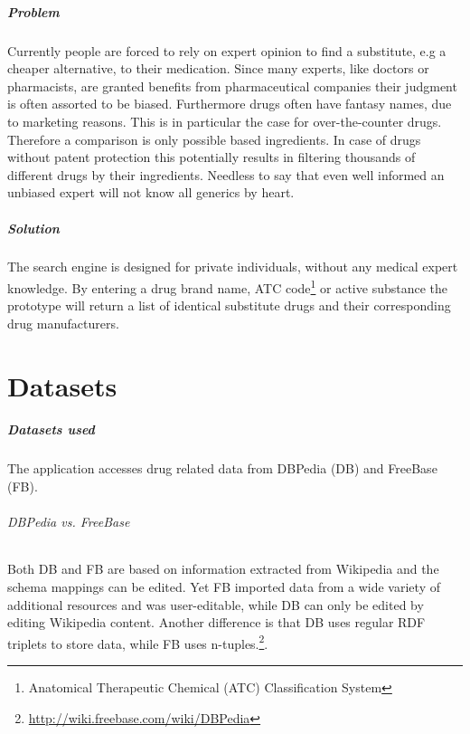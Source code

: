 \documentclass[11pt,titlepage,oneside,openany]{book}
\begin{document}
\paragraph{Problem} \label{problem}
Currently people are forced to rely on expert opinion to find a substitute, e.g a cheaper alternative, to their medication. Since many experts, like doctors or pharmacists, are granted benefits from pharmaceutical companies their judgment is often assorted to be biased.
Furthermore drugs often have fantasy names, due to marketing reasons. This is in particular the case for over-the-counter drugs. Therefore a comparison is only possible based ingredients.
In case of drugs without patent protection this potentially results in filtering thousands of different drugs by their ingredients. Needless to say that even well informed an unbiased expert will not know all generics by heart.


\paragraph{Solution} 
The search engine is designed for private individuals, without any medical expert knowledge.
\label{solution} %
 By entering a drug brand name, ATC code\footnote{Anatomical Therapeutic Chemical (ATC) Classification System} or active substance the prototype will return a list of identical substitute drugs and their corresponding drug manufacturers.


\chapter{Datasets}
\label{cha:datasets}

\paragraph{Datasets used}
\label{datasets_used}
The application accesses drug related data from DBPedia (DB) and FreeBase (FB).

\subparagraph{DBPedia vs. FreeBase}
\label{db_vs_fb}
Both DB and FB are based on information extracted from Wikipedia and the schema mappings can be edited. Yet FB imported data from a wide variety of additional resources and was user-editable, while DB can only be edited by editing Wikipedia content. Another difference is that DB uses regular RDF triplets to store data, while FB uses n-tuples.\footnote{\url{http://wiki.freebase.com/wiki/DBPedia}}.
\end{document}
